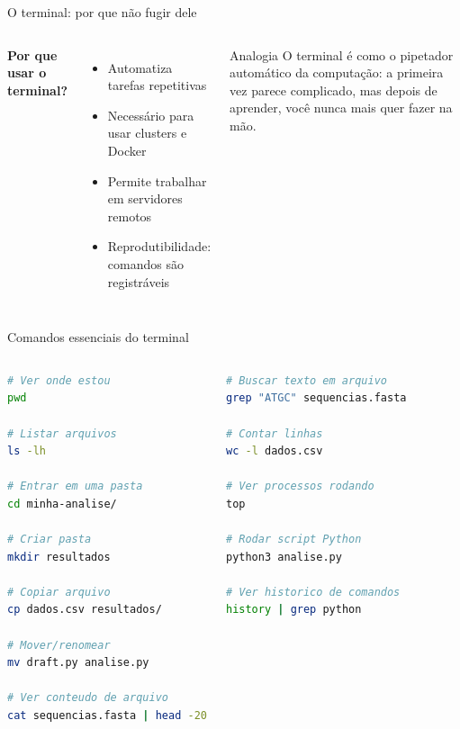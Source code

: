\begin{frame}[fragile]{O terminal: por que não fugir dele}

\vspace{0.3cm}

\begin{columns}
\textbf{Por que usar o terminal?}
\begin{itemize}
    \item Automatiza tarefas repetitivas
    \item Necessário para usar clusters e Docker
    \item Permite trabalhar em servidores remotos
    \item Reprodutibilidade: comandos são registráveis
\end{itemize}

\begin{exampleblock}{Analogia}
O terminal é como o pipetador automático da computação: a primeira vez parece complicado, mas depois de aprender, você nunca mais quer fazer na mão.
\end{exampleblock}
\end{columns}
\end{frame}

\begin{frame}[fragile, shrink=15]{Comandos essenciais do terminal}
\begin{columns}
\begin{lstlisting}[language=bash, caption=Navegação e arquivos, basicstyle=\ttfamily\footnotesize]
# Ver onde estou
pwd

# Listar arquivos
ls -lh

# Entrar em uma pasta
cd minha-analise/

# Criar pasta
mkdir resultados

# Copiar arquivo
cp dados.csv resultados/

# Mover/renomear
mv draft.py analise.py

# Ver conteudo de arquivo
cat sequencias.fasta | head -20
\end{lstlisting}

\begin{lstlisting}[language=bash, caption=Busca e processos, basicstyle=\ttfamily\footnotesize]
# Buscar texto em arquivo
grep "ATGC" sequencias.fasta

# Contar linhas
wc -l dados.csv

# Ver processos rodando
top

# Rodar script Python
python3 analise.py

# Ver historico de comandos
history | grep python
\end{lstlisting}
\end{columns}
\end{frame}

